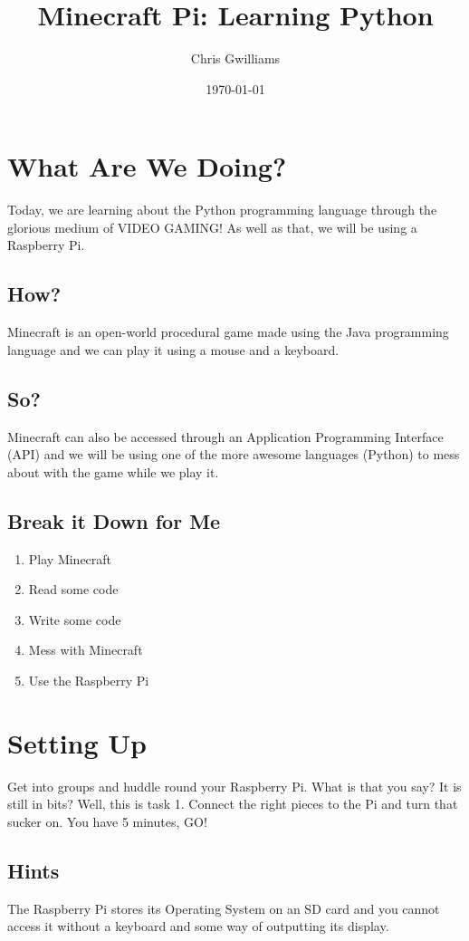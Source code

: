 \documentclass[]{paper}
\begin{document}
\title{Minecraft Pi: Learning Python}
\author{Chris Gwilliams}
\date{\today}
\maketitle

\section*{What Are We Doing?}
Today, we are learning about the Python programming language through the glorious medium of VIDEO GAMING! As well as that, we will be using a Raspberry Pi.
\subsection*{How?}
Minecraft is an open-world procedural game made using the Java programming language and we can play it using a mouse and a keyboard. 
\subsection*{So?}
Minecraft can also be accessed through an Application Programming Interface (API) and we will be using one of the more awesome languages (Python) to mess about with the game while we play it.
\subsection*{Break it Down for Me}
\begin{enumerate}
	\item Play Minecraft
	\item Read some code
	\item Write some code
	\item Mess with Minecraft
	\item Use the Raspberry Pi
\end{enumerate}

\section{Setting Up}
Get into groups and huddle round your Raspberry Pi. What is that you say? It is still in bits? Well, this is task 1. Connect the right pieces to the Pi and turn that sucker on. You have 5 minutes, GO!
\subsection*{Hints}
 	The Raspberry Pi stores its Operating System on an SD card and you cannot access it without a keyboard and some way of outputting its display.
\end{document}
